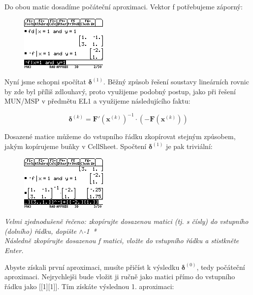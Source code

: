 \documentclass[10pt,a4paper,float]{article}
\begin{document}
Do obou matic dosadíme počáteční aproximaci. Vektor f potřebujeme záporný:

\begin{figure}[H]
	\centering
	\includegraphics[width=.5\textwidth]{img/2NEWTON5.PNG}
\end{figure}

Nyní jsme schopni spočítat $\boldsymbol{\delta}^{(1)}$. Běžný způsob řešení soustavy lineárních rovnic by zde byl příliš zdlouhavý, proto využijeme podobný postup, jako při řešení MUN/MSP v předmětu EL1 a využijeme následujícího faktu:

\[
	\boldsymbol{\delta}^{(k)} = \mathbf{F'}(\mathbf{x}^{(k)})^{-1} \cdot \left( - \mathbf{F}(\mathbf{x}^{(k)}) \right)
\]

Dosazené matice můžeme do vstupního řádku zkopírovat stejným způsobem, jakým kopírujeme buňky v CellSheet. Spočtení $\boldsymbol{\delta}^{(1)}$ je pak triviální:

\begin{figure}[H]
	\centering
	\includegraphics[width=.5\textwidth]{img/2NEWTON6.PNG}
\end{figure}

\textit{Velmi zjednodušeně řečeno: zkopírujte dosazenou matici (tj. s čísly) do vstupního (dolního) řádku, dopište $\wedge$-1~*\\
Následně zkopírujte dosazenou f matici, vložte do vstupního řádku a stistkněte Enter.}

Abyste získali první aproximaci, musíte přičíst k výsledku $\boldsymbol{\delta}^{(0)}$, tedy počáteční aproximaci. Nejrychlejši bude vložit ji ručně jako matici přímo do vstupního řádku jako [[1][1]]. Tím získáte výslednou 1. aproximaci:
\end{document}
